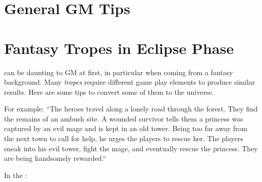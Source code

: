 
\begin{multicols}{2}

\section*{General GM Tips}
\section*{Fantasy Tropes in Eclipse Phase}


\eclipsephase can be daunting to GM at first, in particular when coming from a fantasy background.
%
Many \textit{tropes} require different game play elements to produce similar results.
%
Here are some tips to convert some of them to the \eclipsephase universe.

\medskip

For example:
``The heroes travel along a lonely road through the forest.
They find the remains of an ambush site.
A wounded survivor tells them a princess was captured by an evil mage and is kept in an old tower.
Being too far away from the next town to call for help, he urges the players to rescue her.
The players sneak into his evil tower, fight the mage, and eventually rescue the princess.
They are being handsomely rewarded.``

In the \eclipsephase:

\end{multicols}

